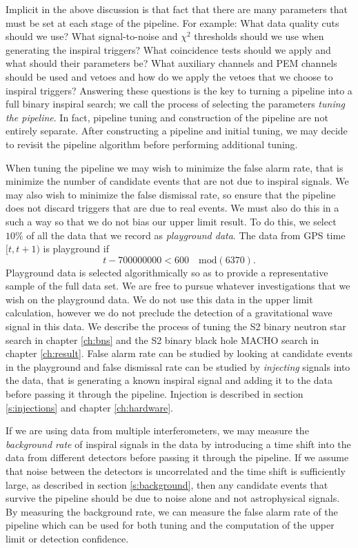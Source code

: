 Implicit in the above discussion is that fact that there are many parameters
that must be set at each stage of the pipeline. For example: What data quality
cuts should we use? What signal-to-noise and $\chi^2$ thresholds should we use
when generating the inspiral triggers? What coincidence tests should we apply
and what should their parameters be? What auxiliary channels and PEM channels
should be used and vetoes and how do we apply the vetoes that we choose to
inspiral triggers? Answering these questions is the key to turning a pipeline
into a full binary inspiral search; we call the process of selecting the
parameters \emph{tuning the pipeline}. In fact, pipeline tuning and
construction of the pipeline are not entirely separate. After constructing a
pipeline and initial tuning, we may decide to revisit the pipeline algorithm
before performing additional tuning.

When tuning the pipeline we may wish to minimize the false alarm rate, that is
minimize the number of candidate events that are not due to inspiral signals.
We may also wish to minimize the false dismissal rate, so ensure that the
pipeline does not discard triggers that are due to real events. We must also
do this in a such a way so that we do not bias our upper limit result. To do
this, we select $10\%$ of all the data that we record as \emph{playground
data}. The data from GPS time $[t,t+1)$ is playground if 
\begin{equation}
t - 700000000  < 600 \quad \mathrm{mod}(6370).
\end{equation}
Playground data is selected algorithmically so as to provide a representative
sample of the full data set. We are free to pursue whatever investigations
that we wish on the playground data. We do not use this data in the upper
limit calculation, however we do not preclude the detection of a gravitational
wave signal in this data. We describe the process of tuning the S2 binary
neutron star search in chapter \ref{ch:bns} and the S2 binary black hole MACHO
search in chapter \ref{ch:result}. False alarm rate can be studied by looking
at candidate events in the playground and false dismissal rate can be studied
by \emph{injecting} signals into the data, that is generating a known inspiral
signal and adding it to the data before passing it through the pipeline.
Injection is described in section \ref{s:injections} and chapter
\ref{ch:hardware}.

If we are using data from multiple interferometers, we may measure the
\emph{background rate} of inspiral signals in the data by introducing a time
shift into the data from different detectors before passing it through the
pipeline. If we assume that noise between the detectors is uncorrelated and
the time shift is sufficiently large, as described in section
\ref{s:background}, then any candidate events that survive the pipeline should
be due to noise alone and not astrophysical signals. By measuring the
background rate, we can measure the false alarm rate of the pipeline which can
be used for both tuning and the computation of the upper limit or detection
confidence.

